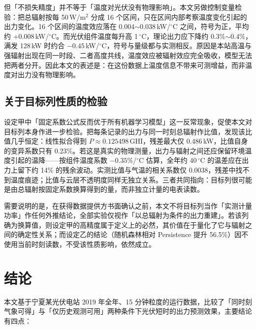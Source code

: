 \documentclass[11pt,a4paper]{ctexart}
\begin{document}
但「不损失精度」并不等于「温度对光伏没有物理影响」。本文另做控制变量检验：把总辐射按每 50\,W/m$^2$ 分成 16 个区间，只在区间内部考察温度变化引起的出力变化。16 个区间的温度效应落在 0.004$\sim$0.038\,kW/$^\circ$C 之间，符号为正，平均约 +0.008\,kW/$^\circ$C。而光伏组件温度每升高 1\,$^\circ$C，理论出力应下降约 0.3\%$\sim$0.4\%，满发 128\,kW 时约合 $-0.45$\,kW/$^\circ$C，符号与量级都与实测相反。原因是本站高温与强辐射出现在同一时段、二者高度共线，温度效应被辐射效应完全吸收，模型无法把两者分开。因此本文的表述是：在这份数据上温度信息不带来可测增益，而非温度对出力没有物理影响。


\subsection{关于目标列性质的检验}\label{sec:targetcheck}

设定甲中「固定系数公式反而优于所有机器学习模型」这一反常现象，促使本文对目标列本身作进一步检验。把每条记录的出力与同一时刻总辐射作比值，发现该比值几乎恒定：线性拟合得到 $P\approx0.125498\,\mathrm{GHI}$，残差最大仅 0.486\,kW，比值自身的变异系数只有 0.23\%。若这是真实的物理测量，出力与辐射之间还应保留环境温度引起的温降——按组件温度系数 $-0.35$\%/$^\circ$C 估算，全年约 40\,$^\circ$C 的温差应在出力上留下约 14\% 的残余波动。实测比值与气温的相关系数仅 0.0038，残差中找不到温度痕迹；比值与云层不透明度同样无独立关系。三者共同指向：目标列很可能是由总辐射按固定系数换算得到的量，而非独立计量的电表读数。

需要说明的是，在获得数据提供方书面确认之前，本文不将目标列当作「实测计量功率」作任何外推结论，全部实验仅视作「以总辐射为条件的出力重建」。若该列确为换算值，则设定甲的高精度属于定义上的必然，其价值在于量化了它与辐射之间的确定性关系；而设定乙的结论（随机森林相对 Persistence 提升 56.5\%）因不使用当前时刻读数，不受该性质影响，依然成立。

\section{结论}

本文基于宁夏某光伏电站 2019 年全年、15 分钟粒度的运行数据，比较了「同时刻气象可得」与「仅历史观测可用」两种条件下光伏短时的出力预测效果，主要结论有四点：
\end{document}
